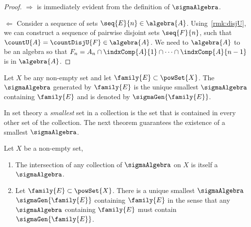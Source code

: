 \begin{proof}
    $\Rightarrow$ is immediately evident from the definition of $\sigmaAlgebra$. 

    $\Leftarrow$ Consider a sequence of sets $\seq{E}{n} \in \algebra{A}$. Using~\ref{rmk:disjU},
	we can construct a sequence of pairwise disjoint sets $\seq{F}{n}$, such that $\countU{A} =
	\countDisjU{F} \in \algebra{A}$. We need to $\algebra{A}$ to be an algebra so that $F_n = A_n\cap
	\indxComp{A}{1}\cap\dots\cap\indxComp{A}{n-1}$ is in $\algebra{A}$. 
\end{proof}
\begin{Definition}[name=Generated $\sigmaAlgebra$]
    Let $X$ be any non-empty set and let $\family{E} \subset \powSet{X}$. The $\sigmaAlgebra$
    generated by $\family{E}$ is the unique smallest $\sigmaAlgebra$ containing $\family{E}$ and is
    denoted by $\sigmaGen{\family{E}}$.
\end{Definition}
In set theory a \emph{smallest} set in a collection is the set that is contained in every other set
of the collection. The next theorem guarantees the existence of a smallest $\sigmaAlgebra$.
\begin{Theorem}[name=Sigma Algebra generated by an arbitrary collection]\label{thm:sigma_al_gen}
    Let $X$ be a non-empty set,
    \begin{enumerate}
	\item
	    The intersection of any collection of $\sigmaAlgebra$ on $X$ is
	    itself a $\sigmaAlgebra$.
	\item 
	    Let $\family{E} \subset \powSet{X}$. There is a unique smallest $\sigmaAlgebra$
	    $\sigmaGen{\family{E}}$ containing $\family{E}$ in the sense that any $\sigmaAlgebra$ 
	    containing $\family{E}$ must contain $\sigmaGen{\family{E}}$.
    \end{enumerate}
\end{Theorem}
